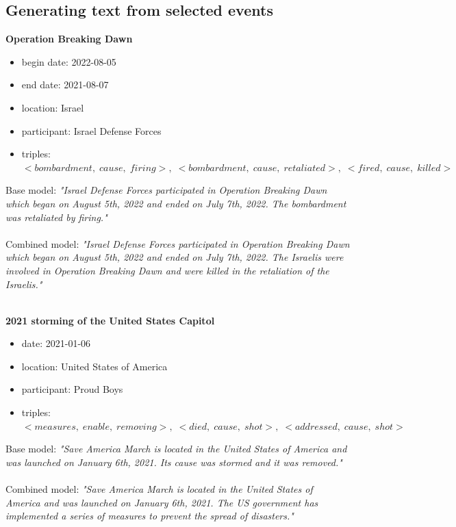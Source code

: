 \documentclass[
hf, %
]{ceurart}
\begin{document}
\subsection{Generating text from selected events}
\label{appx:selected_processed_events}

\textbf{Operation Breaking Dawn}
\begin{itemize}
	\item begin date: 2022-08-05
	\item end date: 2021-08-07
	\item location: Israel
	\item participant: Israel Defense Forces
	\item triples: $<bombardment,\;cause,\;firing>,\; <bombardment,\; cause,\; retaliated>,\; <fired,\; cause,\; killed>$
\end{itemize}
Base model: \textit{"Israel Defense Forces participated in Operation Breaking Dawn which began on August 5th, 2022 and ended on July 7th, 2022. The bombardment was retaliated by firing."}\\\\
\noindent
Combined model: \textit{"Israel Defense Forces participated in Operation Breaking Dawn which began on August 5th, 2022 and ended on July 7th, 2022. The Israelis were involved in Operation Breaking Dawn and were killed in the retaliation of the Israelis."}\\\\
\noindent

\textbf{2021 storming of the United States Capitol}
\begin{itemize}
	\item date: 2021-01-06
	\item location: United States of America
	\item participant: Proud Boys
	\item triples: $<measures,\;enable,\;removing>,\; <died,\; cause,\; shot>,\; <addressed,\; cause,\; shot>$
\end{itemize}
Base model: \textit{"Save America March is located in the United States of America and was launched on January 6th, 2021. Its cause was stormed and it was removed."}\\\\
\noindent
Combined model: \textit{"Save America March is located in the United States of America and was launched on January 6th, 2021. The US government has implemented a series of measures to prevent the spread of disasters."}\\\\
\noindent
\end{document}
